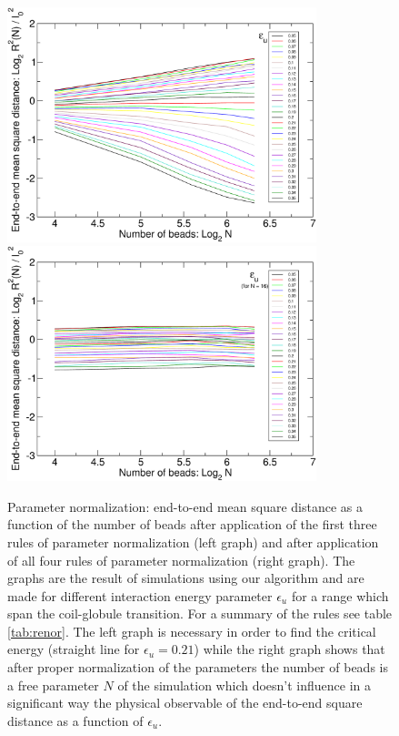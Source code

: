 \documentclass[12pt,a4paper,notitlepage]{article}
\begin{document}
\begin{figure}[h!]
\centering
\includegraphics[width=9cm]{ssK}\includegraphics[width=9cm]{ssL}\\
\caption{Parameter normalization:
  end-to-end mean square distance as a function of the number of beads
  after application of the first three rules of parameter
  normalization (left graph) and after application of all four rules
  of parameter normalization (right graph). The graphs are the result
  of simulations using our algorithm and are made for
  different interaction energy parameter $\epsilon_u$ for a range
  which span the coil-globule transition. For a summary of the rules
  see table \ref{tab:renor}. The left graph is necessary in order to
  find the critical energy (straight line for $\epsilon_u = 0.21$)
  while the right graph shows that after proper normalization of the
  parameters the number of beads is a free parameter $N$ of the
  simulation which doesn't influence in a significant way the physical
  observable of the end-to-end square distance as a function of
  $\epsilon_u$.}
\label{fig:renor}
\end{figure}
\end{document}
